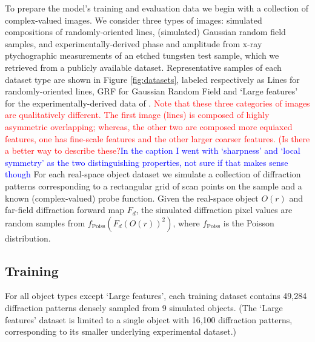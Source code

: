 \documentclass[sn-mathphys]{sn-jnl}%
\theoremstyle{thmstyleone}%
\theoremstyle{thmstyletwo}%
\theoremstyle{thmstylethree}%
\begin{document}
To prepare the model's training and evaluation data we begin with a collection of complex-valued images. We consider three types of images: simulated compositions of randomly-oriented lines, (simulated) Gaussian random field samples, and experimentally-derived phase and amplitude from x-ray ptychographic measurements of an etched tungsten test sample, which we retrieved from a publicly available dataset\cite{cherukara2020ai}. Representative samples of each dataset type are shown in Figure \ref{fig:datasets}, labeled respectively as Lines for randomly-oriented lines, GRF for Gaussian Random Field and `Large features' for the experimentally-derived data of \cite{cherukara2020ai}. \textcolor{red}{Note that these three categories of images are qualitatively different.  The first image (lines) is composed of highly asymmetric overlapping; whereas, the other two are composed more equiaxed features, one has fine-scale features and the other larger coarser features.  (Is there a better way to describe these?}\textcolor{blue}{In the caption I went with `sharpness' and `local symmetry' as the two distinguishing properties, not sure if that makes sense though} For each real-space object dataset we simulate a collection of diffraction patterns corresponding to a rectangular grid of scan points on the sample and a known (complex-valued) probe function. Given the real-space object $O(r)$ and far-field diffraction forward map $F_d$, the simulated diffraction pixel values are random samples from $f_{\text{Poiss}}(F_d(O(r))^2)$, where $f_{\text{Poiss}}$ is the Poisson distribution.

%



\subsection{Training}
For all object types except `Large features', each training dataset contains 49,284 diffraction patterns densely sampled from 9 simulated objects. (The `Large features' dataset is limited to a single object with 16,100 diffraction patterns, corresponding to its smaller underlying experimental dataset.)
\end{document}

